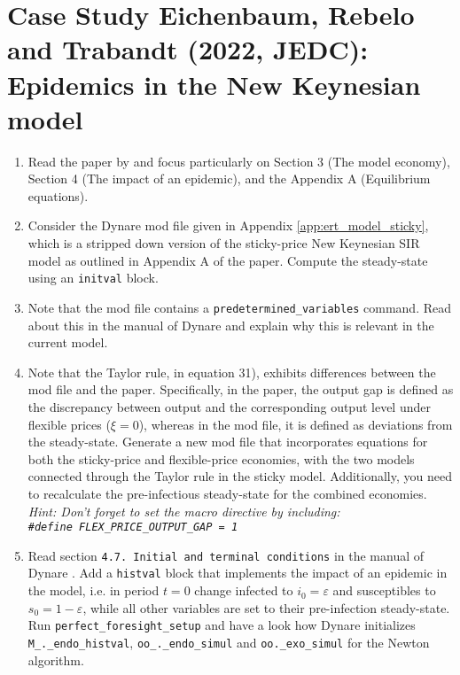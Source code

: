 \section[Case Study Eichenbaum, Rebelo and Trabandt (2022, JEDC): Epidemics in the New Keynesian model]{Case Study Eichenbaum, Rebelo and Trabandt (2022, JEDC): Epidemics in the New Keynesian model\label{ex:CaseStudy.Eichenbaum.Rebelo.Trabandt.2022}}

\begin{enumerate}
\item Read the paper by \textcite{Eichenbaum.Rebelo.Trabandt_2022_EpidemicsNewKeynesian}
  and focus particularly on Section 3 (The model economy), Section 4 (The impact of an epidemic), and the Appendix A (Equilibrium equations).

\item Consider the Dynare mod file given in Appendix \ref{app:ert_model_sticky}, which is a stripped down version of the sticky-price New Keynesian SIR model as outlined in Appendix A of the paper.
Compute the steady-state using an \texttt{initval} block.

\item Note that the mod file contains a \texttt{predetermined\_variables} command.
Read about this in the manual of Dynare \parencite{Adjemian.Bastani.Juillard.EtAl_2022_DynareReferenceManual}
  and explain why this is relevant in the current model.

\item Note that the Taylor rule, in equation 31), exhibits differences between the mod file and the paper.
Specifically, in the paper, the output gap is defined as the discrepancy between output and the corresponding output level under flexible prices ($\xi=0$),
  whereas in the mod file, it is defined as deviations from the steady-state.
Generate a new mod file that incorporates equations for both the sticky-price and flexible-price economies,
  with the two models connected through the Taylor rule in the sticky model.
Additionally, you need to recalculate the pre-infectious steady-state for the combined economies.
\emph{Hint: Don't forget to set the macro directive by including:\\ \texttt{\@\#define FLEX\_PRICE\_OUTPUT\_GAP = 1}}

\item Read section \texttt{4.7. Initial and terminal conditions} in the manual of Dynare \parencite{Adjemian.Bastani.Juillard.EtAl_2022_DynareReferenceManual}.
Add a \texttt{histval} block that implements the impact of an epidemic in the model,
  i.e. in period $t=0$ change infected to $i_0=\varepsilon$ and susceptibles to $s_0=1-\varepsilon$,
  while all other variables are set to their pre-infection steady-state.
Run \texttt{perfect\_foresight\_setup} and have a look how Dynare initializes \texttt{M\_.\_endo\_histval},
  \texttt{oo\_.\_endo\_simul} and \texttt{oo.\_exo\_simul} for the Newton algorithm.


\end{enumerate}
